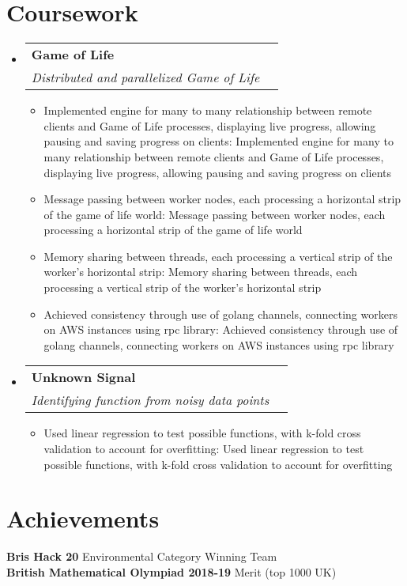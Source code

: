 \documentclass[a4paper,11pt]{article}
\makeatletter
\def \ifempty#1{\def\temp{#1} \ifx\temp\empty }
\newcommand{\resumeItem}[2]{
  \item\small{
  	\ifempty{#1}#2\else\textbf{#1}{: #2 \vspace{-2pt}}\fi
  }
}
\newcommand{\resumeSubheading}[4]{
  \vspace{-1pt}\item
    \begin{tabular*}{0.97\textwidth}{l@{\extracolsep{\fill}}r}
      \textbf{#1} & #2 \\
      \textit{\small#3} & \textit{\small #4} \\
    \end{tabular*}\vspace{-5pt}
}
\newcommand{\resumeSubHeadingListStart}{\begin{itemize}[leftmargin=*]}
\newcommand{\resumeSubHeadingListEnd}{\end{itemize}}
\newcommand{\resumeItemListStart}{\begin{itemize}}
\newcommand{\resumeItemListEnd}{\end{itemize}\vspace{-5pt}}
\makeatother
\begin{document}
\section{Coursework}
  \resumeSubHeadingListStart
    \resumeSubheading
      {Game of Life}{}
      {Distributed and parallelized Game of Life}{}
      \resumeItemListStart
        \resumeItem{}
          {Implemented engine for many to many relationship between remote clients and Game of Life processes, displaying live progress, allowing pausing and saving progress on clients}
        \resumeItem{}
          {Message passing between worker nodes, each processing a horizontal strip of the game of life world}
        \resumeItem{}
          {Memory sharing between threads, each processing a vertical strip of the worker's horizontal strip}
        \resumeItem{}
          {Achieved consistency through use of golang channels, connecting workers on AWS instances using rpc library}
      \resumeItemListEnd
    \resumeSubheading
      {Unknown Signal}{}
      {Identifying function from noisy data points}{}
      \resumeItemListStart
        \resumeItem{}
          {Used linear regression to test possible functions, with k-fold cross validation to account for overfitting}
      \resumeItemListEnd
  \resumeSubHeadingListEnd


\section{Achievements}
  \textbf{Bris Hack 20}{ Environmental Category Winning Team} \\
  \textbf{British Mathematical Olympiad 2018-19}{ Merit (top 1000 UK)} \\
  
  
\end{document}

